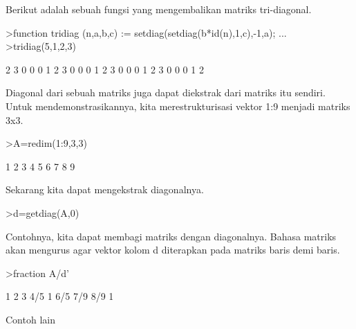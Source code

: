 \documentclass[a4paper,10pt]{article}
\begin{document}
\begin{eulernotebook}
\begin{eulercomment}
\begin{eulercomment}
\begin{eulercomment}
\begin{eulercomment}
\begin{eulercomment}
Berikut adalah sebuah fungsi yang mengembalikan matriks tri-diagonal.
\end{eulercomment}
\begin{eulerprompt}
>function tridiag (n,a,b,c) := setdiag(setdiag(b*id(n),1,c),-1,a); ...
>tridiag(5,1,2,3)
\end{eulerprompt}
\begin{euleroutput}
              2             3             0             0             0 
              1             2             3             0             0 
              0             1             2             3             0 
              0             0             1             2             3 
              0             0             0             1             2 
\end{euleroutput}
\begin{eulercomment}
Diagonal dari sebuah matriks juga dapat diekstrak dari matriks itu
sendiri. Untuk mendemonstrasikannya, kita merestrukturisasi vektor 1:9
menjadi matriks 3x3.
\end{eulercomment}
\begin{eulerprompt}
>A=redim(1:9,3,3)
\end{eulerprompt}
\begin{euleroutput}
              1             2             3 
              4             5             6 
              7             8             9 
\end{euleroutput}
\begin{eulercomment}
Sekarang kita dapat mengekstrak diagonalnya.
\end{eulercomment}
\begin{eulerprompt}
>d=getdiag(A,0)
\end{eulerprompt}
\begin{euleroutput}
  [1,  5,  9]
\end{euleroutput}
\begin{eulercomment}
Contohnya, kita dapat membagi matriks dengan diagonalnya. Bahasa
matriks akan mengurus agar vektor kolom d diterapkan pada matriks
baris demi baris.
\end{eulercomment}
\begin{eulerprompt}
>fraction A/d'
\end{eulerprompt}
\begin{euleroutput}
          1         2         3 
        4/5         1       6/5 
        7/9       8/9         1 
\end{euleroutput}
\begin{eulercomment}
Contoh lain

\end{eulercomment}
\end{eulercomment}
\end{eulercomment}
\end{eulercomment}
\end{eulercomment}
\end{eulernotebook}
\end{document}

